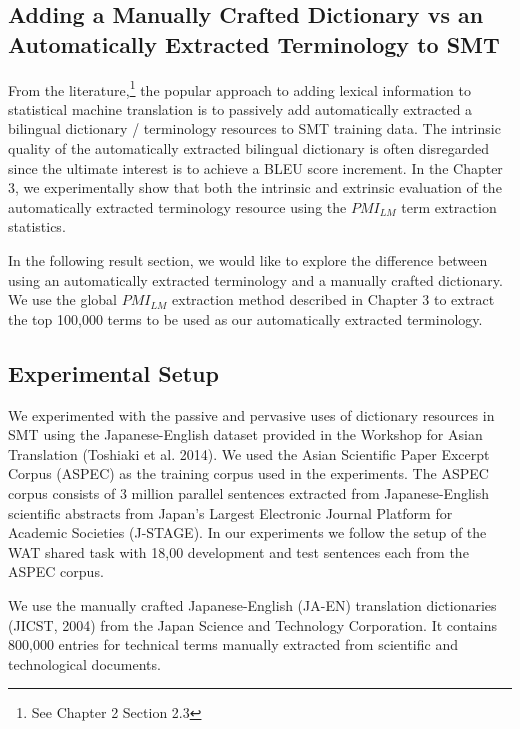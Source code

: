 
\subsection{Adding a Manually Crafted Dictionary vs an Automatically Extracted Terminology to SMT}

From the literature,\footnote{See Chapter 2 Section 2.3} the popular approach to adding lexical information to statistical machine translation is to passively add automatically extracted a bilingual dictionary / terminology resources to SMT training data. The intrinsic quality of the automatically extracted bilingual dictionary is often disregarded since the ultimate interest is to achieve a BLEU score increment. In the Chapter 3, we experimentally show that both the intrinsic and extrinsic evaluation of the automatically extracted terminology resource using the $PMI_{LM}$ term extraction statistics. 

In the following result section, we would like to explore the difference between using an automatically extracted terminology and a manually crafted dictionary. We use the global $PMI_{LM}$ extraction method described in Chapter 3 to extract the top 100,000 terms to be used as our automatically extracted terminology.

\subsection{Experimental Setup}

We experimented with the passive and pervasive uses of dictionary resources in SMT using the Japanese-English dataset provided in the Workshop for Asian Translation (Toshiaki et al. 2014). We used the Asian Scientific Paper Excerpt Corpus (ASPEC) as the training corpus used in the experiments. The ASPEC corpus consists of 3 million parallel sentences extracted from Japanese-English scientific abstracts from Japan’s Largest Electronic Journal Platform for Academic Societies (J-STAGE). In our experiments we follow the setup of the WAT shared task with 18,00 development and test sentences each from the ASPEC corpus. 

We use the manually crafted Japanese-English (JA-EN) translation dictionaries (JICST, 2004) from the Japan Science and Technology Corporation. It contains 800,000 entries for technical terms manually extracted from scientific and technological documents. 

